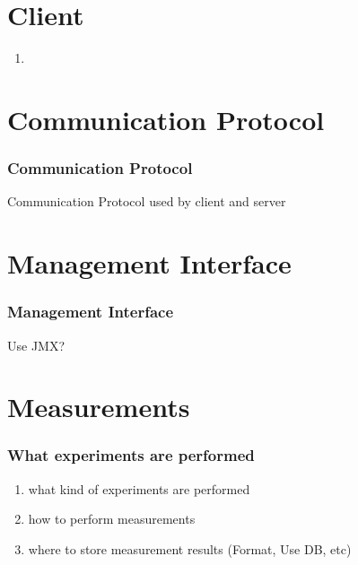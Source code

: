\documentclass{beamer}
\begin{document}
\section{Client}
\begin{frame}
\begin{enumerate}
\item 
\end{enumerate}
\end{frame}


\section{Communication Protocol}
\begin{frame}
\frametitle{Communication Protocol}
Communication Protocol used by client and server
\end{frame}



\section{Management Interface}
\begin{frame}
\frametitle{Management Interface}
Use JMX?
\end{frame}


\section{Measurements}
\begin{frame}
\frametitle{What experiments are performed}


\begin{enumerate}
\item what kind of experiments are performed
\item how to perform measurements
\item where to store measurement results (Format, Use DB, etc)
\end{enumerate}

\end{frame}
\end{document}
